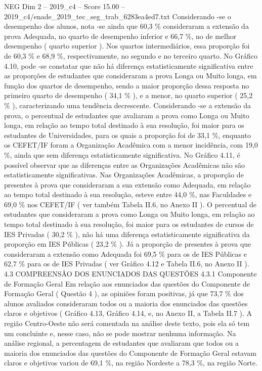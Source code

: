 \begin{textsample}{NEG Dim 2 – 2019\_c4 – Score 15.00 – 2019\_c4/enade\_2019\_tec\_seg\_trab\_6283ea4ed7.txt}
Considerando -se o desempenho dos alunos, nota -se ainda que 60,3 \% consideraram a extensão da prova Adequada, no quarto de desempenho inferior e 66,7 \%, no de melhor desempenho ( quarto superior ).
Nos quartos intermediários, essa proporção foi de 60,3 \% e 68,9 \%, respectivamente, no segundo e no terceiro quarto.
No Gráfico 4.10, pode -se constatar que não há diferença estatisticamente significativa entre as proporções de estudantes que consideraram a prova Longa ou Muito longa, em função dos quartos de desempenho, sendo a maior proporção dessa resposta no primeiro quarto de desempenho ( 34,1 \% ), e a menor, no quarto superior ( 25,2 \% ), caracterizando uma tendência decrescente.
Considerando -se a extensão da prova, o percentual de estudantes que avaliaram a prova como Longa ou Muito longa, em relação ao tempo total destinado à sua resolução, foi maior para os estudantes de Universidades, para os quais a proporção foi de 33,1 \%, enquanto os CEFET/IF foram a Organização Acadêmica com a menor incidência, com 19,0 \%, ainda que sem diferença estatisticamente significativa.
No Gráfico 4.11, é possível observar que as diferenças entre as Organizações Acadêmicas não são estatisticamente significativas.
Nas Organizações Acadêmicas, a proporção de presentes à prova que consideraram a sua extensão como Adequada, em relação ao tempo total destinado à sua resolução, esteve entre 44,0 \%, nas Faculdades e 69,0 \% nos CEFET/IF ( ver também Tabela II.6, no Anexo II ).
O percentual de estudantes que consideraram a prova como Longa ou Muito longa, em relação ao tempo total destinado à sua resolução, foi maior para os estudantes de cursos de IES Privadas ( 30,2 \% ), não há uma diferença estatisticamente significativa da proporção em IES Públicas ( 23,2 \% ).
Já a proporção de presentes à prova que consideraram a extensão como Adequada foi 69,5 \% para os de IES Públicas e 62,7 \% para os de IES Privadas ( ver Gráfico 4.12 e Tabela II.6, no Anexo II ). 4.3 COMPREENSÃO DOS ENUNCIADOS DAS QUESTÕES 4.3.1 Componente de Formação Geral Em relação aos enunciados das questões do Componente de Formação Geral ( Questão 4 ), as opiniões foram positivas, já que 73,7 \% dos alunos avaliados consideraram todos ou a maioria dos enunciados das questões claros e objetivos ( Gráfico 4.13, Gráfico 4.14, e, no Anexo II, a Tabela II.7 ).
A região Centro-Oeste não será comentada na análise deste texto, pois ela só tem um concluinte e, nesse caso, não se pode mostrar nenhuma informação.
Na análise regional, a percentagem de estudantes que avaliaram que todos ou a maioria dos enunciados das questões do Componente de Formação Geral estavam claros e objetivos variou de 69,1 \%, na região Nordeste a 78,3 \%, na região Norte.

\end{textsample}
